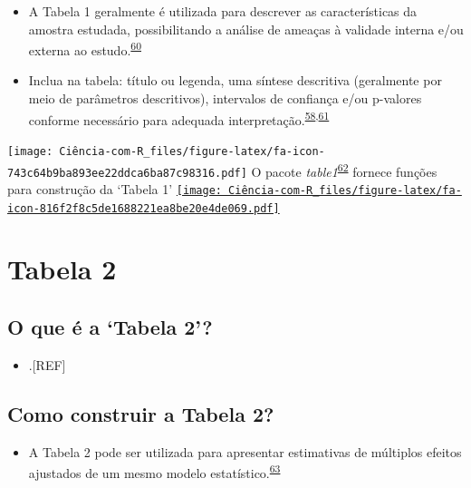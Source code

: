 \documentclass[
]{book}
\providecommand{\tightlist}{%
  \setlength{\itemsep}{0pt}\setlength{\parskip}{0pt}}
\begin{document}
\begin{itemize}
\item
  A Tabela 1 geralmente é utilizada para descrever as características da amostra estudada, possibilitando a análise de ameaças à validade interna e/ou externa ao estudo.\textsuperscript{\protect\hyperlink{ref-Hayes-Larson2019}{60}}
\item
  Inclua na tabela: título ou legenda, uma síntese descritiva (geralmente por meio de parâmetros descritivos), intervalos de confiança e/ou p-valores conforme necessário para adequada interpretação.\textsuperscript{\protect\hyperlink{ref-Inskip2017}{58},\protect\hyperlink{ref-Kwak2021}{61}}
\end{itemize}

\texttt{[image: Ciência-com-R\_files/figure-latex/fa-icon-743c64b9ba893ee22ddca6ba87c98316.pdf]} O pacote \emph{table1}\textsuperscript{\protect\hyperlink{ref-table1}{62}} fornece funções para construção da `Tabela 1' \href{https://cran.r-project.org/web/packages/table1/index.html}{\texttt{[image: Ciência-com-R\_files/figure-latex/fa-icon-816f2f8c5de1688221ea8be20e4de069.pdf]}}

\hypertarget{tabela-2}{%
\section{Tabela 2}\label{tabela-2}}

\hypertarget{o-que-uxe9-a-tabela-2}{%
\subsection{O que é a `Tabela 2'?}\label{o-que-uxe9-a-tabela-2}}

\begin{itemize}
\tightlist
\item
  .{[}REF{]}
\end{itemize}

\hypertarget{como-construir-a-tabela-2}{%
\subsection{Como construir a Tabela 2?}\label{como-construir-a-tabela-2}}

\begin{itemize}
\tightlist
\item
  A Tabela 2 pode ser utilizada para apresentar estimativas de múltiplos efeitos ajustados de um mesmo modelo estatístico.\textsuperscript{\protect\hyperlink{ref-Westreich2013}{63}}
\end{itemize}
\end{document}
